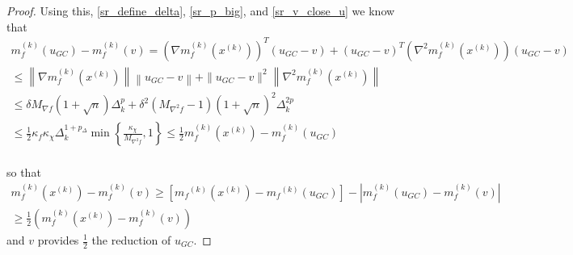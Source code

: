 \documentclass{article}
\theoremstyle{case}
\newcommand{\xk}{{x^{(k)}}}
\newcommand{\dk}{\Delta_k}
\newcommand{\gfmin}{M_{\nabla f}}
\newcommand{\mfk}{{{m}_f}^{(k)}}
\newcommand{\gk}{{\nabla m_f^{(k)}(x^{(k)})}}
\newcommand{\hfb}{{M_{\nabla^2 f}}}
\begin{document}
\begin{proof}
% 
% 
% 
% 


Using this, \cref{sr_define_delta}, \cref{sr_p_big}, and \cref{sr_v_close_u} we know that
\begin{align*}
m_f^{(k)}(u_{GC}) - m_f^{(k)}(v) = 
\left(\gk\right)^T(u_{GC} - v) + \left(u_{GC} - v\right) ^T\left(\nabla^2m_f^{(k)}\left(\xk\right)\right)\left(u_{GC} - v\right) \\
\le \left\|\gk\right \|  \left\|u_{GC}- v\right\|  + \|u_{GC} - v\|^2 \left\|\nabla^2m_f^{(k)}\left(\xk\right)\right\|\\
\le \delta\gfmin \left(1 + \sqrt{n}\right) \dk^{p}  + \delta^2 \left(\hfb - 1\right)\left(1 + \sqrt{n}\right)^2\dk^{2p} \\
\le \frac 1 2 \kappa_f \kappa_{\chi} \dk^{1 + p_{\Delta}}\min\left\{ \frac{\kappa_{\chi}}{\hfb}, 1 \right\}
\le \frac 1 2 m_f^{(k)}(\xk) - m_f^{(k)}(u_{GC}) \\
\end{align*}

so that
\begin{align}
m_f^{(k)}(\xk) - m_f^{(k)}(v) \ge \left[\mfk(\xk) - \mfk(u_{GC})\right] - \left|m_f^{(k)}(u_{GC}) - m_f^{(k)}(v) \right| \nonumber \\
\ge \frac 1 2 \left(m_f^{(k)}(\xk) - m_f^{(k)}(v)\right) \label{sr_sr}
\end{align}
and $v$ provides $\frac 1 2$ the reduction of $u_{GC}$.


\end{proof}
\end{document}
